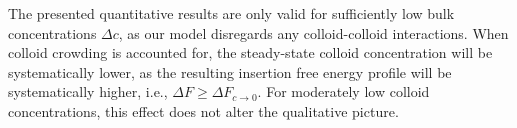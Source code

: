 \documentclass[12pt, a4paper]{article}
\newcommand\todo[1]{\textcolor{red}{#1}}
\begin{document}





The presented quantitative results are only valid for sufficiently low bulk concentrations $\Delta c$, as our model disregards any colloid-colloid interactions.
When colloid crowding is accounted for, the steady-state colloid concentration will be systematically lower, as the resulting insertion free energy profile will be systematically higher, i.e., $\Delta F \ge \Delta F_{c \to 0}$.
For moderately low colloid concentrations, this effect does not alter the qualitative picture.
\end{document}
